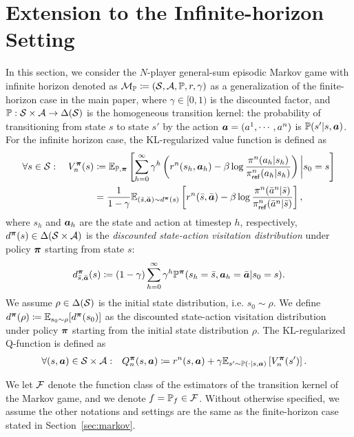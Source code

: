  
\section{Extension to the Infinite-horizon Setting}\label{app:infinite}

In this section, we consider the $N$-player general-sum episodic Markov game with infinite horizon denoted as ${\mathcal{M}}_{\mathbb P}\coloneqq({\mathcal{S}},{\mathcal{A}},{\mathbb P}, r,\gamma)$ as a generalization of the finite-horizon case in the main paper, where $\gamma\in[0,1)$ is the discounted factor, and ${\mathbb P}:{\mathcal{S}}\times{\mathcal{A}}\rightarrow\Delta({\mathcal{S}})$ is the homogeneous transition kernel: the probability of transitioning from state $s$ to state $s'$ by the action ${\bm{a}}=(a^1,\cdots,a^n)$ is ${\mathbb P}(s'|s,{\bm{a}})$. For the infinite horizon case, the KL-regularized value function is defined as
\begin{align}\label{eq:V_beta_infinite}
    \forall s\in{\mathcal{S}}:\quad V_{n}^{{\bm{\pi}}}(s)&\coloneqq \mathbb{E}_{{\mathbb P},{\bm{\pi}}}\left[\sum_{h=0}^\infty \gamma^h\left(r^n(s_h,{\bm{a}}_h)-\beta\log\frac{\pi^n(a_h|s_h)}{\pi_{\mathsf{ref}}^n(a_h|s_h)}\right)\bigg|s_0=s\right]\notag\\
    &=\frac{1}{1-\gamma}\mathbb{E}_{(\bar s,\bar{{\bm{a}}})\sim d^{\bm{\pi}}(s)}\left[r^n(\bar s,\bar {{\bm{a}}})-\beta\log\frac{\pi^n(\bar a^n|\bar s)}{\pi_{\mathsf{ref}}^n(\bar a^n|\bar s)}\right],
\end{align}
where $s_h$ and ${\bm{a}}_h$ are the state and action at timestep $h$, respectively, $d^{\bm{\pi}}(s)\in\Delta({\mathcal{S}}\times{\mathcal{A}})$ is the \textit{discounted state-action visitation distribution} under policy ${\bm{\pi}}$ starting from state $s$:
\begin{align}\label{eq:state_action_visitation_infinite}
    d^{\bm{\pi}}_{\bar s, \bar {{\bm{a}}}}(s)\coloneqq (1-\gamma)\sum_{h=0}^\infty \gamma^h {\mathbb P}^{{\bm{\pi}}}(s_h = \bar s, {\bm{a}}_h =  \bar {{\bm{a}}}|s_0=s).
\end{align}
We assume $\rho\in\Delta({\mathcal{S}})$ is the initial state distribution, i.e. $s_0\sim\rho$.
We define $d^{\bm{\pi}}(\rho)\coloneqq \mathbb{E}_{s_0\sim\rho}[d^{\bm{\pi}}(s_0)]$ as the discounted state-action visitation distribution under policy ${\bm{\pi}}$ starting from the initial state distribution $\rho$.
The KL-regularized Q-function is defined as
\begin{align}\label{eq:Q_beta_infinite}
    \forall (s,{\bm{a}})\in{\mathcal{S}}\times{\mathcal{A}}:&\quad Q_{n}^{{\bm{\pi}}}(s,{\bm{a}})\coloneqq r^n(s,{\bm{a}}) +  \gamma\mathbb{E}_{s'\sim{\mathbb P}(\cdot|s,{\bm{a}})}\left[V_{n}^{{\bm{\pi}}}(s')\right].
\end{align}

We let ${\mathcal{F}}$ denote the function class of the estimators of the transition kernel of the Markov game, and we denote $f={\mathbb P}_f\in{\mathcal{F}}$.
Without otherwise specified, we assume the other notations and settings are the same as the finite-horizon case stated in Section~\ref{sec:markov}.



